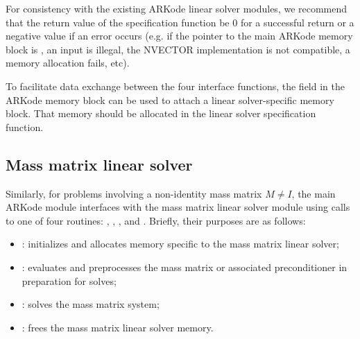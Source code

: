 \documentclass[letterpaper,10pt,english]{sphinxmanual}
\begin{document}
For consistency with the existing ARKode linear solver modules, we
recommend that the return value of the specification function be 0 for
a successful return or a negative value if an error occurs (e.g. if
the pointer to the main ARKode memory block is , an input is
illegal, the NVECTOR implementation is not compatible, a memory
allocation fails, etc).

To facilitate data exchange between the four interface functions, the
field  in the ARKode memory block can be used to attach a
linear solver-specific memory block. That memory should be allocated
in the linear solver specification function.


\subsection{Mass matrix linear solver}
\label{linear_solvers/custom:mass-matrix-linear-solver}
Similarly, for problems involving a non-identity mass matrix
$M\ne I$, the main ARKode module interfaces with the mass matrix
linear solver module using calls to one of four routines:
{\hyperref[linear_solvers/custom:minit]{}}, {\hyperref[linear_solvers/custom:msetup]{}}, {\hyperref[linear_solvers/custom:msolve]{}}, and
{\hyperref[linear_solvers/custom:mfree]{}}. Briefly, their purposes are as follows:
\begin{itemize}
\item {} 
{\hyperref[linear_solvers/custom:minit]{}}: initializes and allocates memory specific to the
mass matrix linear solver;

\item {} 
{\hyperref[linear_solvers/custom:msetup]{}}: evaluates and preprocesses the mass matrix or
associated preconditioner in preparation for solves;

\item {} 
{\hyperref[linear_solvers/custom:msolve]{}}: solves the mass matrix system;

\item {} 
{\hyperref[linear_solvers/custom:mfree]{}}: frees the mass matrix linear solver memory.

\end{itemize}
\end{document}
